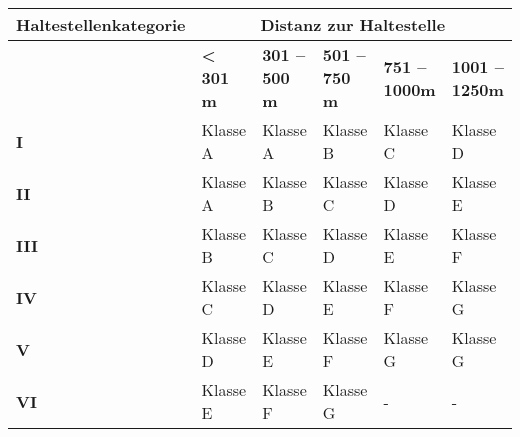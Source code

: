 \begin{table}[ht]
    \begin{tabular}[c]{l p{2.0cm} p{2.0cm} p{2.0cm} p{2.0cm} p{2.0cm}}
        \toprule
        \textbf{Haltestellenkategorie}
                                & \multicolumn{5}{c}{\textbf{Distanz zur \gls{Haltestelle}}}\\
        \midrule
        \textbf{}
                                & \textbf{< 301 m}
                                & \textbf{301 -- 500 m}
                                & \textbf{501 -- 750 m}
                                & \textbf{751 -- 1000m}
                                & \textbf{1001 -- 1250m}\\
        \textbf{I}
                                & Klasse A
                                & Klasse A
                                & Klasse B
                                & Klasse C
                                & \cellcolor{red!25}Klasse D\\
        \textbf{II}
                                & Klasse A
                                & Klasse B
                                & Klasse C
                                & Klasse D
                                & \cellcolor{red!25}Klasse E\\
        \textbf{III}
                                & Klasse B
                                & Klasse C
                                & Klasse D
                                & \cellcolor{red!25}Klasse E
                                & \cellcolor{red!25}Klasse F\\
        \textbf{IV}
                                & Klasse C
                                & Klasse D
                                & \cellcolor{red!25}Klasse E
                                & \cellcolor{red!25}Klasse F
                                & \cellcolor{red!25}Klasse G\\
        \textbf{V}
                                & Klasse D
                                & \cellcolor{red!25}Klasse E
                                & \cellcolor{red!25}Klasse F
                                & \cellcolor{red!25}Klasse G
                                & \cellcolor{red!25}Klasse G\\
        \cellcolor{red!25}\textbf{VI}
                                & \cellcolor{red!25}Klasse E
                                & \cellcolor{red!25}Klasse F
                                & \cellcolor{red!25}Klasse G
                                & -
                                & -\\

\end{tabular}
\end{table}
